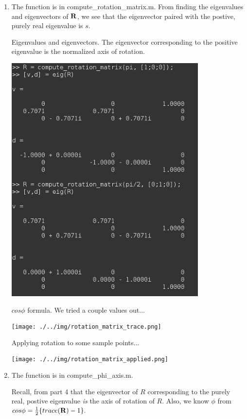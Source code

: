 \documentclass[11pt]{article}
\begin{document}
\begin{enumerate}
\item
    The function is in compute\_rotation\_matrix.m.
    From finding the eigenvalues and eigenvectors of ${\bf R}$, we see that
    the eigenvector paired with the postive, purely real eigenvalue is $s$.

    Eigenvalues and eigenvectors.  The eigenvector corresponding to the
    positive eigenvalue is the normalized axis of rotation.

    \includegraphics[height=5in]{./../img/rotation_matrix_eig.png}

    $cos\phi$ formula.  We tried a couple values out...

    \texttt{[image: ./../img/rotation\_matrix\_trace.png]}

    Applying rotation to some sample points...

    \texttt{[image: ./../img/rotation\_matrix\_applied.png]}

\item
    The function is in compute\_phi\_axis.m. %

    Recall, from part 4 that the eigenvector of $R$ corresponding to the
    purely real, postive eigenvalue {\it is} the axis of rotation of $R$.
    Also, we know $\phi$ from $cos\phi = \frac{1}{2}\{trace({\bf R}) - 1\}.$

\end{enumerate}
\end{document}
